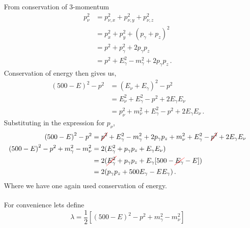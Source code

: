 From conservation of 3-momentum
 \begin{align}
 {p}_{\nu}^{2} &= {p}_{\nu,x}^{2} + {p}_{\nu,y}^{2} + {p}_{\nu,z}^{2} \\
 					&= {p}_{x}^{2} + {p}_{y}^{2} + {({p}_{\gamma} + {p}_{z})}^{2} \\
 					&= {p}^{2} + {p}_{\gamma}^{2} + 2{p}_{\gamma}{p}_{z} \\
 					&=  {p}^{2} + {E}_{\gamma}^{2} - {m}_{\gamma}^{2} + 2{p}_{\gamma}{p}_{z} \, .
 \end{align}
Conservation of energy then gives us,
 \begin{align}
 {(500 - E)}^2 - {p}^{2} &= {({E}_{\nu} + {E}_{\gamma})}^2  - {p}^{2} \\
 								   &= {E}_{\nu}^{2}  + {E}_{\gamma}^{2} - {p}^{2} + 2{E}_{\gamma}{E}_{\nu}\\
 								   &= {p}_{\nu}^{2}  + {m}_{\nu}^{2} + {E}_{\gamma}^{2} - {p}^{2} + 2{E}_{\gamma}{E}_{\nu}\, .
 \end{align}
Substituting in the expression for ${p}_{\nu}$,
 \begin{align}
{(500 - E)}^2 - {p}^{2} &=  \Cancel[red]{{p}^{2}} + {E}_{\gamma}^{2} - {m}_{\gamma}^{2} + 2{p}_{\gamma}{p}_{z} + {m}_{\nu}^{2} + {E}_{\gamma}^{2} - \Cancel[red]{{p}^{2}} + 2{E}_{\gamma}{E}_{\nu}\\
  {(500 - E)}^2 - {p}^{2} + {m}_{\gamma}^{2} - {m}_{\nu}^{2}
  								&=  2({E}_{\gamma}^{2} + {p}_{\gamma}{p}_{z} + {E}_{\gamma}{E}_{\nu})\\
  								&=  2( \Cancel[red]{{E}_{\gamma}^{2}} + {p}_{\gamma}{p}_{z} + {E}_{\gamma}[500 -  \Cancel[red]{{E}_{\gamma}} - E])\\
  								&=  2( {p}_{\gamma}{p}_{z} + 500{E}_{\gamma} - E{E}_{\gamma} )\, .
 \end{align}
 Where we have one again used conservation of energy.\\\\
 For convenience lets define
\begin{equation}
    {\lambda} = \frac{1}{2}[{(500 - E)}^2 - {p}^{2} + {m}_{\gamma}^{2} - {m}_{\nu}^{2}]
\end{equation}


